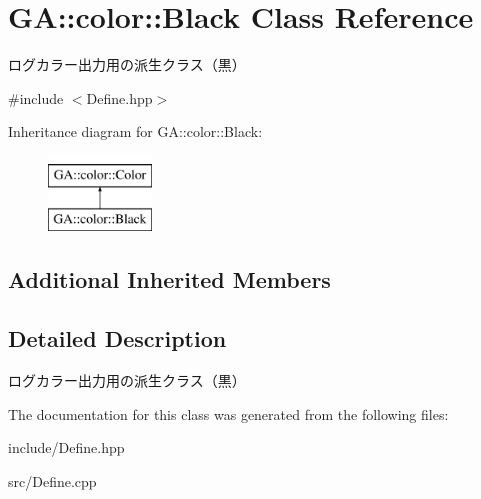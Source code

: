 \hypertarget{class_g_a_1_1color_1_1_black}{}\section{GA\+::color\+::Black Class Reference}
\label{class_g_a_1_1color_1_1_black}


ログカラー出力用の派生クラス（黒）  




{\ttfamily \#include $<$Define.\+hpp$>$}

Inheritance diagram for GA\+::color\+::Black\+:\begin{figure}[H]
\begin{center}
\leavevmode
\includegraphics[height=2.000000cm]{class_g_a_1_1color_1_1_black}
\end{center}
\end{figure}
\subsection*{Additional Inherited Members}


\subsection{Detailed Description}
ログカラー出力用の派生クラス（黒） 



The documentation for this class was generated from the following files\+:\begin{DoxyCompactItemize}
\item 
include/Define.\+hpp\item 
src/Define.\+cpp\end{DoxyCompactItemize}
